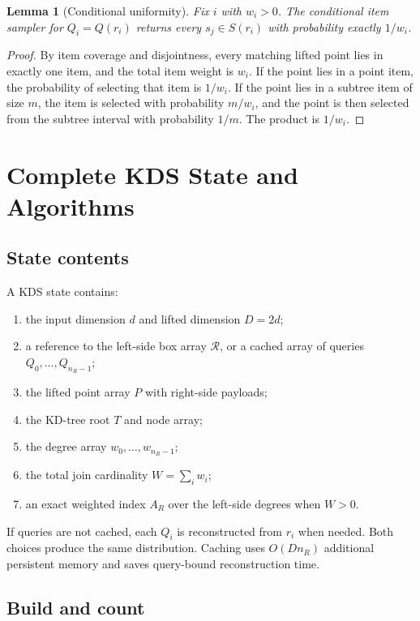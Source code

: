 \documentclass[11pt]{article}
\theoremstyle{definition}
\theoremstyle{plain}
\newtheorem{lemma}{Lemma}[section]
\theoremstyle{remark}
\newcommand{\Rrel}{\mathcal R}
\begin{document}
\begin{lemma}[Conditional uniformity]
Fix $i$ with $w_i>0$.  The conditional item sampler for $Q_i=Q(r_i)$ returns every
$s_j\in S(r_i)$ with probability exactly $1/w_i$.
\end{lemma}

\begin{proof}
By item coverage and disjointness, every matching lifted point lies in exactly one item, and
the total item weight is $w_i$.  If the point lies in a point item, the probability of
selecting that item is $1/w_i$.  If the point lies in a subtree item of size $m$, the item is
selected with probability $m/w_i$, and the point is then selected from the subtree interval
with probability $1/m$.  The product is $1/w_i$.
\end{proof}

\section{Complete KDS State and Algorithms}

\subsection{State contents}

A KDS state contains:
\begin{enumerate}[leftmargin=2em]
  \item the input dimension $d$ and lifted dimension $D=2d$;
  \item a reference to the left-side box array $\Rrel$, or a cached array of queries
        $Q_0,\ldots,Q_{n_R-1}$;
  \item the lifted point array $P$ with right-side payloads;
  \item the KD-tree root $T$ and node array;
  \item the degree array $w_0,\ldots,w_{n_R-1}$;
  \item the total join cardinality $W=\sum_i w_i$;
  \item an exact weighted index $A_R$ over the left-side degrees when $W>0$.
\end{enumerate}
If queries are not cached, each $Q_i$ is reconstructed from $r_i$ when needed.  Both choices
produce the same distribution.  Caching uses $O(Dn_R)$ additional persistent memory and saves
query-bound reconstruction time.

\subsection{Build and count}
\end{document}

